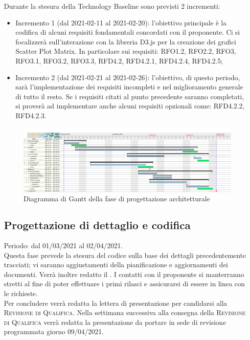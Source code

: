 \documentclass[../piano_di_progetto.tex]{subfiles}
\begin{document}
Durante la stesura della Technology Baseline sono previsti 2 incrementi:
\begin{itemize}
    \item Incremento 1 (dal 2021-02-11 al 2021-02-20): l'obiettivo principale è la codifica di alcuni requisiti fondamentali concordati con il proponente. Ci si focalizzerà sull'interazione con la libreria D3.js per la creazione dei grafici Scatter Plot Matrix. In particolare sui requisiti: RFO1.2, RFO2.2, RFO3, RFO3.1, RFO3.2, RFO3.3, RFD4.2, RFD4.2.1, RFD4.2.4, RFD4.2.5;
\item Incremento 2 (dal 2021-02-21 al 2021-02-26): l'obiettivo, di questo periodo, sarà l'implementazione dei requisiti incompleti e nel miglioramento generale di tutto il resto. Se i requisiti citati al punto precedente saranno completati, si proverà ad implementare anche alcuni requisiti opzionali come: RFD4.2.2, RFD4.2.3.
\end{itemize}

\begin{figure}[H]
\centering
\includegraphics[width=18cm]{img/gantt/02_RP.png}
\caption{Diagramma di Gantt della fase di progettazione architetturale}
\end{figure}

\subsection{Progettazione di dettaglio e codifica}%
\label{sub:prog_dett}
Periodo: dal 01/03/2021 al 02/04/2021.\\
Questa fase prevede la stesura del codice sulla base dei dettagli precedentemente tracciati; vi saranno aggiustamenti della pianificazione e aggiornamenti dei documenti. Verrà inoltre redatto il \textsc{}. I contatti con il proponente si manterranno stretti al fine di poter effettuare i primi rilasci e assicurarsi di essere in linea con le richieste.\\
Per concludere verrà redatta la lettera di presentazione per candidarsi alla \textsc{Revisione di Qualifica}. Nella settimana successiva alla consegna della \textsc{Revisione di Qualifica} verrà redatta la presentazione da portare in sede di revisione programmata giorno 09/04/2021. 
\end{document}
